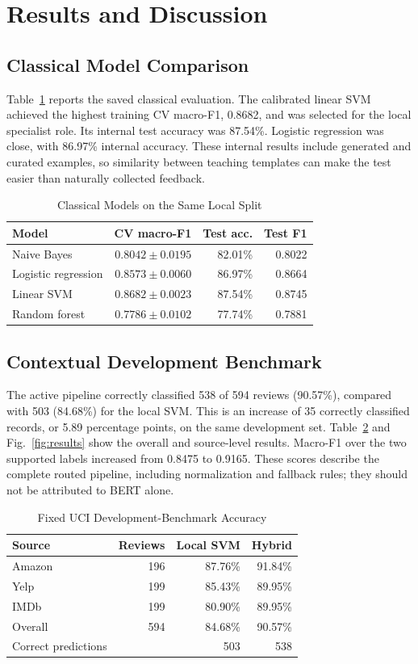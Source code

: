 \documentclass[conference,a4paper]{IEEEtran}
\begin{document}
\section{Results and Discussion}
\subsection{Classical Model Comparison}
Table~\ref{tab:classic} reports the saved classical evaluation. The calibrated linear SVM achieved the highest training CV macro-F1, 0.8682, and was selected for the local specialist role. Its internal test accuracy was 87.54\%. Logistic regression was close, with 86.97\% internal accuracy. These internal results include generated and curated examples, so similarity between teaching templates can make the test easier than naturally collected feedback.

\begin{table}[t]
\caption{Classical Models on the Same Local Split}
\label{tab:classic}
\centering\footnotesize
\begin{tabular}{lrrr}
\toprule
Model & CV macro-F1 & Test acc. & Test F1\\\midrule
Naive Bayes & $0.8042\!\pm\!0.0195$ & 82.01\% & 0.8022\\
Logistic regression & $0.8573\!\pm\!0.0060$ & 86.97\% & 0.8664\\
Linear SVM & $0.8682\!\pm\!0.0023$ & 87.54\% & 0.8745\\
Random forest & $0.7786\!\pm\!0.0102$ & 77.74\% & 0.7881\\\bottomrule
\end{tabular}
\end{table}

\subsection{Contextual Development Benchmark}
The active pipeline correctly classified 538 of 594 reviews (90.57\%), compared with 503 (84.68\%) for the local SVM. This is an increase of 35 correctly classified records, or 5.89 percentage points, on the same development set. Table~\ref{tab:benchmark} and Fig.~\ref{fig:results} show the overall and source-level results. Macro-F1 over the two supported labels increased from 0.8475 to 0.9165. These scores describe the complete routed pipeline, including normalization and fallback rules; they should not be attributed to BERT alone.

\begin{table}[t]
\caption{Fixed UCI Development-Benchmark Accuracy}
\label{tab:benchmark}
\centering\footnotesize
\begin{tabular}{lrrr}
\toprule
Source & Reviews & Local SVM & Hybrid\\\midrule
Amazon & 196 & 87.76\% & 91.84\%\\
Yelp & 199 & 85.43\% & 89.95\%\\
IMDb & 199 & 80.90\% & 89.95\%\\\midrule
Overall & 594 & 84.68\% & 90.57\%\\
Correct predictions & & 503 & 538\\\bottomrule
\end{tabular}
\end{table}
\end{document}

